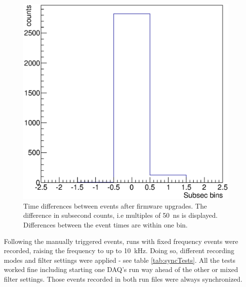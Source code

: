  \begin{figure}
  \centering
  \includegraphics[width = 0.9 \textwidth]{graphics/sync/sync.eps}
	\caption[Synchronisation new firmware]{Time differences between events after firmware upgrades. The difference in subsecond counts, i.e multiples of \SI{50}{\nano\second} is displayed. Differences between the event times are within one bin.}
  \end{figure}
  Following the manually triggered events, runs with fixed frequency events were recorded, raising the frequency to up to \SI{10}{\kilo\hertz}. Doing so, different recording modes and filter settings were applied - see table \ref{tab:syncTests}. All the tests worked fine including starting one DAQ's run way ahead of the other or mixed filter settings. Those events recorded in both run files were always synchronized.
